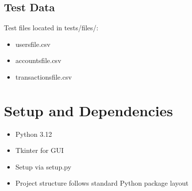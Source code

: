 \documentclass[a4paper,11pt]{article}
\begin{document}
\subsection{Test Data}
Test files located in tests/files/:
\begin{itemize}
\item usersfile.csv
\item accountsfile.csv
\item transactionsfile.csv
\end{itemize}

\section{Setup and Dependencies}
\begin{itemize}
\item Python 3.12
\item Tkinter for GUI
\item Setup via setup.py
\item Project structure follows standard Python package layout
\end{itemize}
\end{document}

